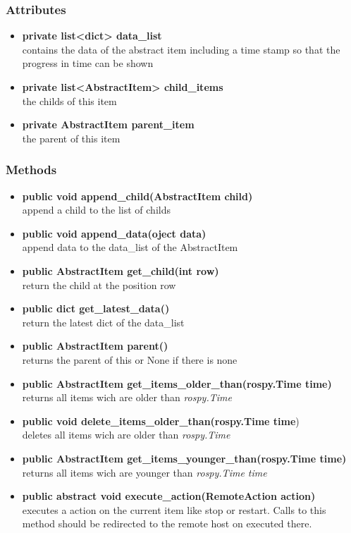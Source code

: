 \subsubsection{Attributes}
\begin{itemize}
  \item \textbf{private list<dict> data\_list}\\ 
  contains the data of the abstract item including a time stamp so that
  the progress in time can be shown
  \item \textbf{private list<AbstractItem> child\_items}\\ 
  the childs of this item
  \item \textbf{private AbstractItem parent\_item}\\ 
  the parent of this item
\end{itemize}
\subsubsection{Methods}
\begin{itemize}
   \item \textbf{public void append\_child(AbstractItem child)}\\ 
   append a child to the list of childs
  \item \textbf{public void append\_data(oject data)}\\ 
  append data to the data\_list of the AbstractItem
  \item \textbf{public AbstractItem get\_child(int row)}\\ 
  return the child at the position row
  \item \textbf{public dict get\_latest\_data()}\\ 
  return the latest dict of the data\_list 
  \item \textbf{public AbstractItem parent()}\\ 
  returns the parent of this or None if there is none
  \item \textbf{public AbstractItem get\_items\_older\_than(rospy.Time time)}\\
  returns all items wich are older than \textit{rospy.Time}
  \item \textbf{public void delete\_items\_older\_than(rospy.Time time})\\
  deletes all items wich are older than \textit{rospy.Time}
  \item \textbf{public AbstractItem get\_items\_younger\_than(rospy.Time time)}\\
  returns all items wich are younger than \textit{rospy.Time time}
  \item \textbf{public abstract void execute\_action(RemoteAction action)}\\ 
  executes a action on the current item like stop or restart. Calls to this
  method should be redirected to the remote host on executed there.
\end{itemize}

